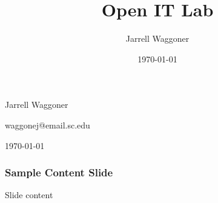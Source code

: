 \documentclass{beamer}
\title[Students]{Open IT Lab}
\author{Jarrell Waggoner}
\institute[Open IT Lab] {Open IT Lab\\
  \medskip
      {\emph{waggonej@email.sc.edu}} }
\date{\today}
\begin{document}
\rm

{
  \begin{frame}
    \vspace{12em}

    \begin{center}\large{\textcolor{beamer@mygrey}{Jarrell Waggoner}}\end{center}

    \begin{center}\small{\textcolor{beamer@mygreen}{waggonej@email.sc.edu}}\end{center}

    \begin{center}\small{\textcolor{beamer@mygrey}{\today}}\end{center}
  \end{frame}
}

\begin{frame}
  \frametitle{Sample Content Slide}
  Slide content
\end{frame}


\end{document}
